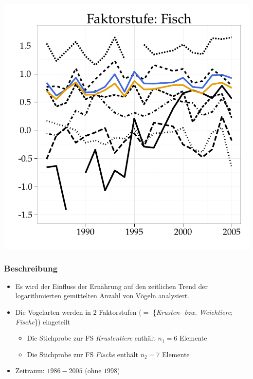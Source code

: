 \documentclass[xcolor=dvipsnames, compress, serif, professionalfont, handout]{beamer}
\newenvironment{knitrout}{}{} %
\renewenvironment{knitrout}{\begin{footnotesize}}{\end{footnotesize}}
\begin{document}
\begin{frame}[fragile]
\begin{minipage}{0.48\textwidth}
\begin{knitrout}
{\centering \includegraphics[width=\linewidth,height=\linewidth]{figure/graphics-GR_Fisch} 

}


\end{knitrout}

  \end{minipage}
\end{frame}

%
%

\begin{frame}[fragile]
\frametitle{Beschreibung}
  \begin{itemize}
    \item<1-> Es wird der Einfluss der Ern\"ahrung auf den zeitlichen 
          Trend der logarithmierten gemittelten Anzahl von V\"ogeln analysiert. 
    \item<2-> Die Vogelarten werden in $2$ Faktorstufen ($=$ 
          \{\textit{Krusten- bzw. Weichtiere}; \textit{Fische}\}) eingeteilt
    \begin{itemize}
          \item<2-> Die Stichprobe zur FS \textit{Krustentiere} enth\"alt $n_1 = 6$ 
                Elemente
          \item<2-> Die Stichprobe zur FS \textit{Fische} enth\"alt $n_2 = 7$ Elemente
    \end{itemize}
    \item<3-> Zeitraum: $1986-2005$ (ohne $1998$) 
  \end{itemize}
\end{frame}
\end{document}

